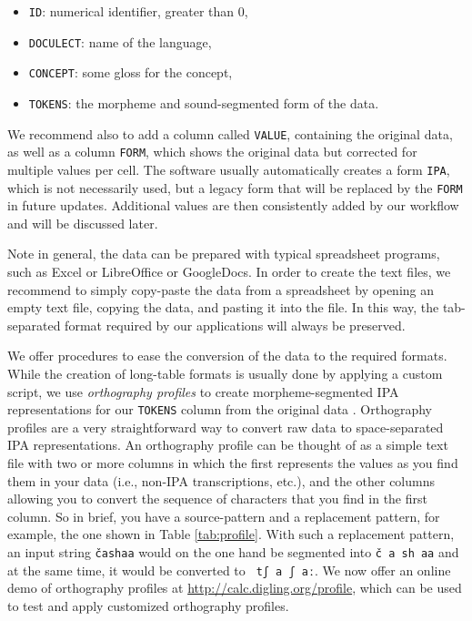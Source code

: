 \documentclass[xetex,svgnames]{scrartcl}
\begin{document}
\begin{itemize}
  \item \texttt{ID}: numerical identifier, greater than 0,
  \item \texttt{DOCULECT}: name of the language,
  \item \texttt{CONCEPT}: some gloss for the concept,
  \item \texttt{TOKENS}: the morpheme and sound-segmented form of the data.
\end{itemize}

We recommend also to add a column called \texttt{VALUE}, containing the original data, as well as a
column \texttt{FORM}, which shows the original data but corrected for multiple values per cell. The
software usually automatically creates a form \texttt{IPA}, which is not necessarily used, but a
legacy form that will be replaced by the \texttt{FORM} in future updates.
Additional values are then consistently added by our workflow and will be discussed later.

Note in general, the data can be prepared with typical spreadsheet programs, such as Excel or
LibreOffice or GoogleDocs. In order to create the text files, we recommend to simply copy-paste the
data from a spreadsheet by opening an empty text file, copying the data, and pasting it into the
file. In this way, the tab-separated format required by our applications will always be preserved.

We offer procedures to ease the conversion of the data to the required formats. While the creation
of long-table formats is usually done by applying a custom script, we use \emph{orthography
profiles} to create morpheme-segmented IPA representations for our \texttt{TOKENS} column from the
original data \citep{Moran2018}. Orthography profiles are a very straightforward way to convert raw
data to space-separated IPA representations. An orthography profile can be thought of as a simple text file with two or more columns in which the first
represents the values as you find them in your data (i.e., non-IPA transcriptions, etc.), and the other
columns allowing you to convert the sequence of characters that you find in the first column. So in brief,
you have a source-pattern and a replacement pattern, for example, the one shown in Table
\ref{tab:profile}. With such a replacement pattern, an input string \texttt{čashaa} would on the one
hand be segmented into \texttt{č a sh aa} and at the same time, it would be converted to \texttt{ tʃ
a ʃ aː}. We now offer an online demo of orthography profiles at
\url{http://calc.digling.org/profile}, which can be used to test and apply customized orthography
profiles.
\end{document}
